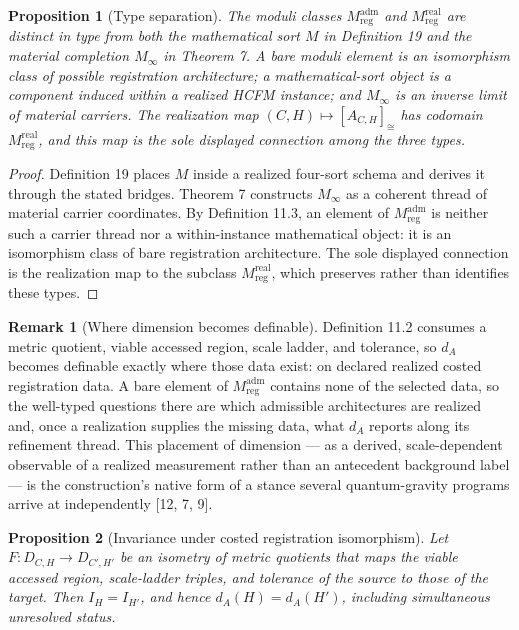 \documentclass[11pt]{article}
\newtheorem{proposition}{Proposition}
\theoremstyle{definition}
\newtheorem{remark}{Remark}
\newcommand{\Minf}{M_\infty}
\begin{document}
\begin{proposition}[Type separation]
The moduli classes $M^{\mathrm{adm}}_{\mathrm{reg}}$ and $M^{\mathrm{real}}_{\mathrm{reg}}$ are distinct in type from both the mathematical sort $M$ in Definition 19 and the material completion $\Minf$ in Theorem 7. A bare moduli element is an isomorphism class of possible registration architecture; a mathematical-sort object is a component induced within a realized HCFM instance; and $\Minf$ is an inverse limit of material carriers. The realization map $(C, H) \mapsto [A_{C,H}]_{\cong}$ has codomain $M^{\mathrm{real}}_{\mathrm{reg}}$, and this map is the sole displayed connection among the three types.
\end{proposition}

\begin{proof}
Definition 19 places $M$ inside a realized four-sort schema and derives it through the stated bridges. Theorem 7 constructs $\Minf$ as a coherent thread of material carrier coordinates. By Definition 11.3, an element of $M^{\mathrm{adm}}_{\mathrm{reg}}$ is neither such a carrier thread nor a within-instance mathematical object: it is an isomorphism class of bare registration architecture. The sole displayed connection is the realization map to the subclass $M^{\mathrm{real}}_{\mathrm{reg}}$, which preserves rather than identifies these types.
\end{proof}

\begin{remark}[Where dimension becomes definable]
Definition 11.2 consumes a metric quotient, viable accessed region, scale ladder, and tolerance, so $d_A$ becomes definable exactly where those data exist: on declared realized costed registration data. A bare element of $M^{\mathrm{adm}}_{\mathrm{reg}}$ contains none of the selected data, so the well-typed questions there are which admissible architectures are realized and, once a realization supplies the missing data, what $d_A$ reports along its refinement thread. This placement of dimension --- as a derived, scale-dependent observable of a realized measurement rather than an antecedent background label --- is the construction's native form of a stance several quantum-gravity programs arrive at independently [12, 7, 9].
\end{remark}

\begin{proposition}[Invariance under costed registration isomorphism]
Let $F : D_{C,H} \to D_{C',H'}$ be an isometry of metric quotients that maps the viable accessed region, scale-ladder triples, and tolerance of the source to those of the target. Then $I_H = I_{H'}$, and hence $d_A(H) = d_A(H')$, including simultaneous unresolved status.
\end{proposition}
\end{document}
